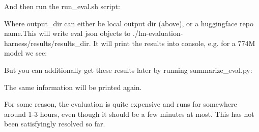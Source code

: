 And then run the run\+\_\+eval.\+sh script\+:


\begin{DoxyCode}{0}

\end{DoxyCode}


Where output\+\_\+dir can either be local output dir (above), or a huggingface repo name.\+This will write eval json objects to {\ttfamily ./lm-\/evaluation-\/harness/results/results\+\_\+dir}. It will print the results into console, e.\+g. for a 774M model we see\+:


\begin{DoxyCode}{0}
\DoxyCodeLine{-\/-\/-\/-\/-\/-\/-\/-\/-\/-\/-\/-\/-\/-\/-\/-\/-\/-\/-\/-\/-\/-\/-\/-\/-\/-\/-\/-\/-\/-\/-\/-\/-\/-\/-\/-\/-\/-\/-\/-\/}
\DoxyCodeLine{-\/-\/-\/-\/-\/-\/-\/-\/-\/-\/-\/-\/-\/-\/-\/-\/-\/-\/-\/-\/-\/-\/-\/-\/-\/-\/-\/-\/-\/-\/-\/-\/-\/-\/-\/-\/-\/-\/-\/-\/}

\end{DoxyCode}


But you can additionally get these results later by running {\ttfamily summarize\+\_\+eval.\+py}\+:


\begin{DoxyCode}{0}

\end{DoxyCode}


The same information will be printed again.

For some reason, the evaluation is quite expensive and runs for somewhere around 1-\/3 hours, even though it should be a few minutes at most. This has not been satisfyingly resolved so far. 